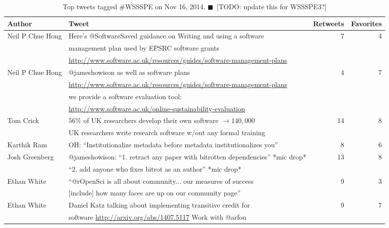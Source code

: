 \documentclass[11pt, oneside]{amsart}
\newcommand{\todo}[1]{{\color{blue}$\blacksquare$~\textsf{[TODO: #1]}}}
\begin{document}
\begin{table*}[t]
\centering
\caption{Top tweets tagged \#WSSSPE on Nov 16, 2014. \todo{update this for WSSSPE3?}}\label{tab:tweets}
  \begin{scriptsize}
  \begin{tabular}{l|l|r|r}
 \hline
    Author  &   Tweet  & Retweets &  Favorites
\\ \hline
%
Neil P Chue Hong   &  Here's @SoftwareSaved guidance on Writing and using a software & 7 & 4
\\     &  management plan used by EPSRC software grants    &    &
\\     &  \url{http://www.software.ac.uk/resources/guides/software-management-plans}  &    &
%
\\  Neil P Chue Hong  &  @jameshowison as well as software plans   & 4 & 7
\\   &   \url{http://www.software.ac.uk/resources/guides/software-management-plans} &    &
\\   &   we provide a software evaluation tool:   &    &
\\   &   \url{http://www.software.ac.uk/online-sustainability-evaluation}  &    &
%
\\ Tom Crick  & $56\%$ of UK researchers develop their own software $\rightarrow  140,000$   &  14 & 8
\\ & UK researchers write research software w$/$out any formal training &    &
%
\\ Karthik Ram  &  OH: ``Institutionalize metadata before metadata institutionalizes you'' & 8 & 6
%
\\ Josh Greenberg  &  @jameshowison: ``1. retract any paper with bitrotten dependencies'' *mic drop* & 13 & 8
\\   &   ``2. add anyone who fixes bitrot as an author'' *mic drop*  &    &
%
\\ Ethan White &  ``@rOpenSci is all about community... our measures of success  & 9 & 3
\\ &   [include] how many faces are up on our community page''   &    &
%
\\ Ethan White & Daniel Katz talking about implementing transitive credit for  & 9 & 7
\\ &  software \url{http://arxiv.org/abs/1407.5117}  Work with @arfon  &    &

\end{tabular}
\end{scriptsize}
\end{table*}
\end{document}
